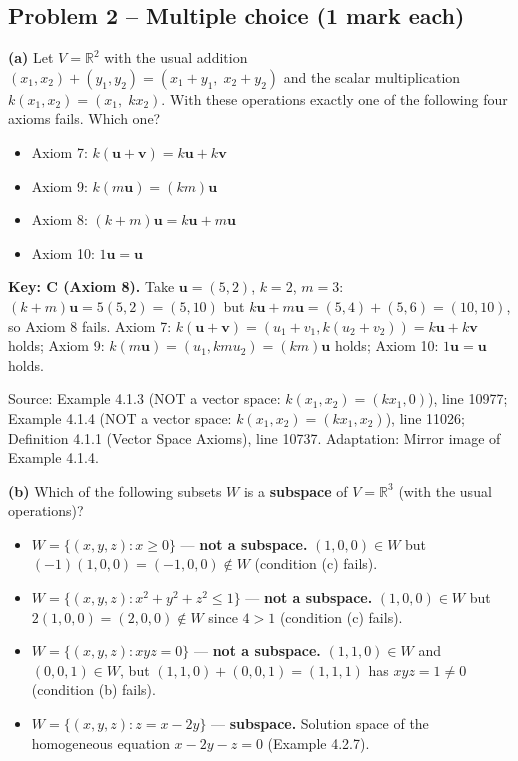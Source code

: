 \documentclass[11pt,a4paper]{article}
\newcommand{\Src}[1]{{\footnotesize\color{black!65}Source: #1}}
\begin{document}
\subsection*{Problem 2 -- Multiple choice (1 mark each)}
\textbf{(a)} Let $V=\mathbb{R}^2$ with the usual addition $(x_1,x_2)+(y_1,y_2)=(x_1+y_1,\;x_2+y_2)$ and the scalar multiplication $k(x_1,x_2)=(x_1,\;kx_2)$. With these operations exactly one of the following four axioms fails. Which one?\par
\begin{itemize}[leftmargin=8mm,itemsep=0pt]\item[A] Axiom 7: $k(\mathbf{u}+\mathbf{v})=k\mathbf{u}+k\mathbf{v}$\item[B] Axiom 9: $k(m\mathbf{u})=(km)\mathbf{u}$\item[C$^{\ast}$] Axiom 8: $(k+m)\mathbf{u}=k\mathbf{u}+m\mathbf{u}$\item[D] Axiom 10: $1\mathbf{u}=\mathbf{u}$\end{itemize}
\textbf{Key: C (Axiom 8).} Take $\mathbf{u}=(5,2)$, $k=2$, $m=3$: $(k+m)\mathbf{u}=5(5,2)=(5,10)$ but $k\mathbf{u}+m\mathbf{u}=(5,4)+(5,6)=(10,10)$, so Axiom 8 fails. Axiom 7: $k(\mathbf{u}+\mathbf{v})=(u_1+v_1,k(u_2+v_2))=k\mathbf{u}+k\mathbf{v}$ holds; Axiom 9: $k(m\mathbf{u})=(u_1,kmu_2)=(km)\mathbf{u}$ holds; Axiom 10: $1\mathbf{u}=\mathbf{u}$ holds.\par
\Src{Example 4.1.3 (NOT a vector space: $k(x_1,x_2)=(kx_1,0)$), line 10977; Example 4.1.4 (NOT a vector space: $k(x_1,x_2)=(kx_1,x_2)$), line 11026; Definition 4.1.1 (Vector Space Axioms), line 10737. Adaptation: Mirror image of Example 4.1.4.}\par
{}\textbf{(b)} Which of the following subsets $W$ is a \textbf{subspace} of $V=\mathbb{R}^3$ (with the usual operations)?\par
\begin{itemize}[leftmargin=8mm,itemsep=0pt]\item[A] $W=\{(x,y,z) : x\ge0\}$ --- \textbf{not a subspace.} $(1,0,0)\in W$ but $(-1)(1,0,0)=(-1,0,0)\notin W$ (condition (c) fails).\item[B] $W=\{(x,y,z) : x^2+y^2+z^2\le1\}$ --- \textbf{not a subspace.} $(1,0,0)\in W$ but $2(1,0,0)=(2,0,0)\notin W$ since $4>1$ (condition (c) fails).\item[C] $W=\{(x,y,z) : xyz=0\}$ --- \textbf{not a subspace.} $(1,1,0)\in W$ and $(0,0,1)\in W$, but $(1,1,0)+(0,0,1)=(1,1,1)$ has $xyz=1\neq0$ (condition (b) fails).\item[D$^{\ast}$] $W=\{(x,y,z) : z=x-2y\}$ --- \textbf{subspace.} Solution space of the homogeneous equation $x-2y-z=0$ (Example 4.2.7).\end{itemize}
\end{document}
